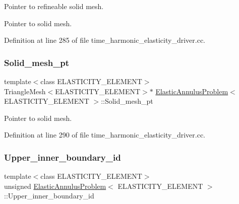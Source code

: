 Pointer to refineable solid mesh. 

Pointer to solid mesh. 

Definition at line 285 of file time\+\_\+harmonic\+\_\+elasticity\+\_\+driver.\+cc.

\mbox{\label{classElasticAnnulusProblem_af1f36137c361d10c5a474ae186ecad3b}} 
\subsubsection{\texorpdfstring{Solid\+\_\+mesh\+\_\+pt}{Solid\_mesh\_pt}\hspace{0.1cm}{\footnotesize\ttfamily [3/3]}}
{\footnotesize\ttfamily template$<$class E\+L\+A\+S\+T\+I\+C\+I\+T\+Y\+\_\+\+E\+L\+E\+M\+E\+NT$>$ \\
Triangle\+Mesh$<$E\+L\+A\+S\+T\+I\+C\+I\+T\+Y\+\_\+\+E\+L\+E\+M\+E\+NT$>$$\ast$ \hyperlink{classElasticAnnulusProblem}{Elastic\+Annulus\+Problem}$<$ E\+L\+A\+S\+T\+I\+C\+I\+T\+Y\+\_\+\+E\+L\+E\+M\+E\+NT $>$\+::Solid\+\_\+mesh\+\_\+pt\hspace{0.3cm}{\ttfamily [private]}}



Pointer to solid mesh. 



Definition at line 290 of file time\+\_\+harmonic\+\_\+elasticity\+\_\+driver.\+cc.

\mbox{\label{classElasticAnnulusProblem_af7228afd4d413dfd09e7a4b5bccedd64}} 
\subsubsection{\texorpdfstring{Upper\+\_\+inner\+\_\+boundary\+\_\+id}{Upper\_inner\_boundary\_id}}
{\footnotesize\ttfamily template$<$class E\+L\+A\+S\+T\+I\+C\+I\+T\+Y\+\_\+\+E\+L\+E\+M\+E\+NT$>$ \\
unsigned \hyperlink{classElasticAnnulusProblem}{Elastic\+Annulus\+Problem}$<$ E\+L\+A\+S\+T\+I\+C\+I\+T\+Y\+\_\+\+E\+L\+E\+M\+E\+NT $>$\+::Upper\+\_\+inner\+\_\+boundary\+\_\+id\hspace{0.3cm}{\ttfamily [private]}}



